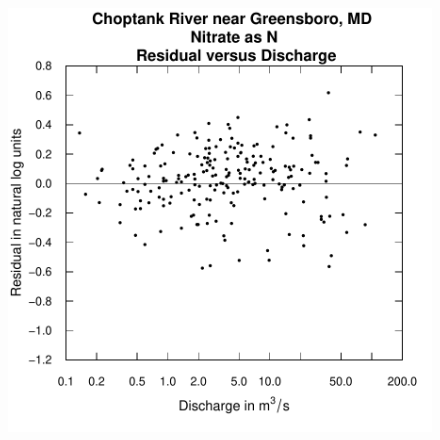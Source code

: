 \documentclass[a4paper,11pt]{article}
\begin{document}
\begin{figure}[htbp]
  \begin{minipage}[h]{0.5\linewidth}
    \begin{center}

\includegraphics{EGRET-figplotResidQ}
    \label{fig:plotResidQ}
    \end{center}
  \end{minipage}
  \begin{minipage}[h]{0.5\linewidth}
    \begin{center}



\end{center}
\end{minipage}
\end{figure}
\end{document}
